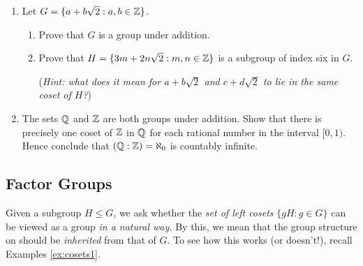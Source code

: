 \begin{exercises}
\begin{enumerate}
		
	\item\label{exs:zsqrt2subgroup} Let $G=\{a+b\sqrt 2:a,b\in\mathbb{Z}\}$.
	\begin{enumerate}
	  \item Prove that $G$ is a group under addition.
	  \item Prove that $H=\{3m+2n\sqrt 2:m,n\in\mathbb{Z}\}$ is a subgroup of index six in $G$.\par
	  (\emph{Hint: what does it mean for $a+b\sqrt 2$ and $c+d\sqrt 2$ to lie in the same coset of $H$?})
	\end{enumerate}
  
  \item\label{exs:zqindex} The sets $\mathbb{Q}$ and $\mathbb{Z}$ are both groups under addition. Show that there is precisely one coset of $\mathbb{Z}$ in $\mathbb{Q}$ for each rational number in the interval $[0,1)$. Hence conclude that $(\mathbb{Q}:\mathbb{Z})=\aleph_0$ is countably infinite.

\end{enumerate}
\end{exercises}


\clearpage

\subsection{Factor Groups}\label{sec:factor}

Given a subgroup $H\le G$, we ask whether the \emph{set of left cosets} $\{gH:g\in G\}$ can be viewed as a group \emph{in a natural way.} By this, we mean that the group structure on should be \emph{inherited} from that of $G$. To see how this works (or doesn't!), recall Examples \ref{ex:cosets1}.

